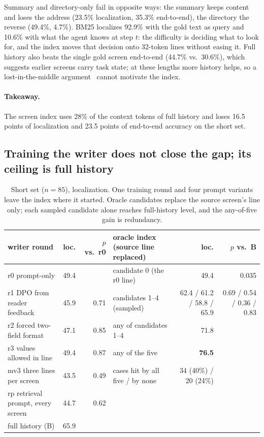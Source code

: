 Summary and directory-only fail in opposite ways: the summary keeps content and loses the address (23.5\% localization, 35.3\% end-to-end), the directory the reverse (49.4\%, 4.7\%). BM25 localizes 92.9\% with the gold text as query and 10.6\% with what the agent knows at step $t$: the difficulty is deciding what to look for, and the index moves that decision onto 32-token lines without easing it. Full history also beats the single gold screen end-to-end (44.7\% vs.\ 30.6\%), which suggests earlier screens carry task state; at these lengths more history helps, so a lost-in-the-middle argument~\citep{lostmiddle} cannot motivate the index.

\paragraph{Takeaway.} The screen index uses 28\% of the context tokens of full history and loses 16.5 points of localization and 23.5 points of end-to-end accuracy on the short set.

\subsection{Training the writer does not close the gap; its ceiling is full history}
\label{sec:writer}
\begin{table}[t]
\centering\footnotesize
\caption{Short set ($n=85$), localization. One training round and four prompt variants leave the index where it started. Oracle candidates replace the source screen's line only; each sampled candidate alone reaches full-history level, and the any-of-five gain is redundancy.}
\label{tab:writer}
\begin{tabular}{lrr@{\hspace{1em}}lrr}
\toprule
writer round & loc. & $p$ vs.\ r0 & oracle index (source line replaced) & loc. & $p$ vs.\ B \\
\midrule
r0 prompt-only & 49.4 & & candidate 0 (the r0 line) & 49.4 & 0.035 \\
r1 DPO from reader feedback & 45.9 & 0.71 & candidates 1--4 (sampled) & 62.4 / 61.2 / 58.8 / 65.9 & 0.69 / 0.54 / 0.36 / 0.83 \\
r2 forced two-field format & 47.1 & 0.85 & any of candidates 1--4 & 71.8 & \\
r3 values allowed in line & 49.4 & 0.87 & any of the five & \textbf{76.5} & \\
mv3 three lines per screen & 43.5 & 0.49 & cases hit by all five / by none & 34 (40\%) / 20 (24\%) & \\
rp retrieval prompt, every screen & 44.7 & 0.62 & & & \\
full history (B) & 65.9 & & & & \\
\bottomrule
\end{tabular}
\end{table}

